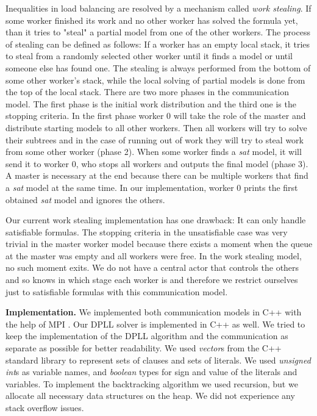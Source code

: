 \documentclass[letterpaper]{article}
\newcommand{\mypar}[1]{{\bf #1.}}
\begin{document}
Inequalities in load balancing are resolved by a mechanism called \textit{work stealing}.
If some worker finished its work and no other worker has solved the formula yet, than it tries to "steal" a partial model from one of the other workers.
The process of stealing can be defined as follows:
If a worker has an empty local stack, it tries to steal from a randomly selected other worker until it finds a model or until someone else has found one.
The stealing is always performed from the bottom of some other worker's stack, while the local solving of partial models is done from the top of the local stack.
There are two more phases in the communication model.
The first phase is the initial work distribution and the third one is the stopping criteria.
In the first phase worker 0 will take the role of the master and distribute starting models to all other workers.
Then all workers will try to solve their subtrees and in the case of running out of work they will try to steal work from some other worker (phase 2).
When some worker finds a \textit{sat} model, it will send it to worker 0, who stops all workers and outputs the final model (phase 3).
A master is necessary at the end because there can be multiple workers that find a \textit{sat} model at the same time.
In our implementation, worker 0 prints the first obtained \textit{sat} model and ignores the others.

Our current work stealing implementation has one drawback:
It can only handle satisfiable formulas.
The stopping criteria in the unsatisfiable case was very trivial in the master worker model because there exists a moment when the queue at the master was empty and all workers were free.
In the work stealing model, no such moment exits.
We do not have a central actor that controls the others and so knows in which stage each worker is and therefore we restrict ourselves just to satisfiable formulas with this communication model.

\mypar{Implementation}
We implemented both communication models in C++ with the help of MPI \cite{mpi}.
Our DPLL solver is implemented in C++ as well.
We tried to keep the implementation of the DPLL algorithm and the communication as separate as possible for better readability.
We used \textit{vector}s from the C++ standard library to represent sets of clauses and sets of literals.
We used \textit{unsigned int}s as variable names, and \textit{boolean} types for sign and value of the literals and variables.
To implement the backtracking algorithm we used recursion, but we allocate all necessary data structures on the heap.
We did not experience any stack overflow issues.
\end{document}
